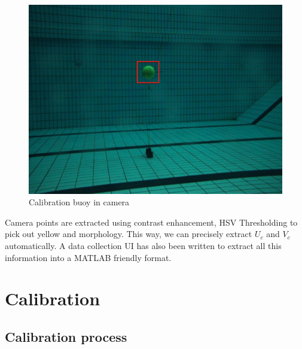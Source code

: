 \documentclass[a4paper]{IEEEtran}
\newcommand{\UCamera}{$\si{\textit{U}_{c}}$\xspace}
\newcommand{\VCamera}{$\si{\textit{V}_{c}}$\xspace}
\begin{document}
\begin{figure}[h!]
  \centering
  \includegraphics[scale=0.3]{buoycamera}
  \captionsetup{justification=centering}
  \caption{Calibration buoy in camera}
\end{figure}

Camera points are extracted using contrast enhancement, HSV Thresholding to pick out yellow and morphology. This way, we can precisely extract \UCamera and \VCamera automatically. A data collection UI has also been written to extract all this information into a MATLAB friendly format.

\section{Calibration}

\subsection{Calibration process}
\end{document}
